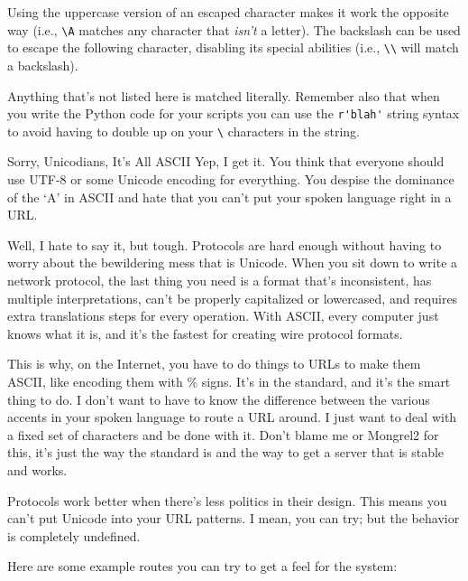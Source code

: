 Using the uppercase version of an escaped character makes it work the opposite
way (i.e., \verb|\A| matches any character that \emph{isn't} a letter). The backslash
can be used to escape the following character, disabling its special abilities (i.e.,
\verb|\\| will match a backslash).

Anything that's not listed here is matched literally.  Remember also that when you write the Python
code for your scripts you can use the \verb|r'blah'| string syntax to avoid having to double up on your
\verb|\| characters in the string.

\begin{aside}{Sorry, Unicodians, It's All ASCII}
Yep, I get it.  You think that everyone should use UTF-8 or some Unicode encoding for everything.
You despise the dominance of the `A' in ASCII and hate that you can't put your spoken language
right in a URL.

Well, I hate to say it, but tough.  Protocols are hard enough without having to
worry about the bewildering mess that is Unicode.  When you sit down to write a
network protocol, the last thing you need is a format that's inconsistent, has
multiple interpretations, can't be properly capitalized or lowercased, and
requires extra translations steps for every operation.  With ASCII, every
computer just knows what it is, and it's the fastest for creating wire protocol
formats.

This is why, on the Internet, you have to do things to URLs to make them ASCII,
like encoding them with \% signs.  It's in the standard, and it's the smart
thing to do.  I don't want to have to know the difference between the various
accents in your spoken language to route a URL around.  I just want to deal
with a fixed set of characters and be done with it.  Don't blame me or Mongrel2
for this, it's just the way the standard is and the way to get a server that is
stable and works.

Protocols work better when there's less politics in their design.  This means
you can't put Unicode into your URL patterns.  I mean, you can try; but the
behavior is completely undefined.

\end{aside}


Here are some example routes you can try to get a feel for the system:

